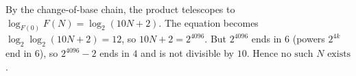 By the change-of-base chain, the product telescopes to $\log_{F(0)}F(N)=\log_2(10N+2)$. The equation becomes $\log_2\log_2(10N+2)=12$, so $10N+2=2^{4096}$. But $2^{4096}$ ends in $6$ (powers $2^{4k}$ end in $6$), so $2^{4096}-2$ ends in $4$ and is not divisible by $10$. Hence $\boxed{\text{no such }N\text{ exists}}$.
